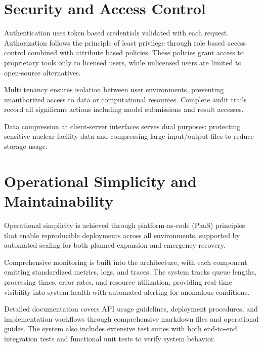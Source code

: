 \section{Security and Access Control}
Authentication uses token based credentials validated with each request. Authorization follows the principle of least privilege through role based access control combined with attribute based policies. These policies grant access to proprietary tools only to licensed users, while unlicensed users are limited to open-source alternatives.

Multi tenancy ensures isolation between user environments, preventing unauthorized access to data or computational resources. Complete audit trails record all significant actions including model submissions and result accesses.

Data compression at client-server interfaces serves dual purposes: protecting sensitive nuclear facility data and compressing large input/output files to reduce storage usage.

\section{Operational Simplicity and Maintainability}
Operational simplicity is achieved through platform-as-code (PaaS) principles that enable reproducible deployments across all environments, supported by automated scaling for both planned expansion and emergency recovery.

Comprehensive monitoring is built into the architecture, with each component emitting standardized metrics, logs, and traces. The system tracks queue lengths, processing times, error rates, and resource utilization, providing real-time visibility into system health with automated alerting for anomalous conditions.

Detailed documentation covers API usage guidelines, deployment procedures, and implementation workflows through comprehensive markdown files and operational guides. The system also includes extensive test suites with both end-to-end integration tests and functional unit tests to verify system behavior.
